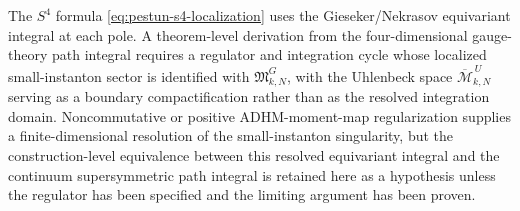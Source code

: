 \begin{hypothesis}
\label{hyp:field-theoretic-gieseker-matching}
The \(S^4\) formula
\eqref{eq:pestun-s4-localization} uses the Gieseker/Nekrasov equivariant
integral at each pole.  A theorem-level derivation from the four-dimensional
gauge-theory path integral requires a regulator and integration cycle whose
localized small-instanton sector is identified with
\(\mathfrak M_{k,N}^{G}\), with the Uhlenbeck space
\(\overline{\mathcal M}_{k,N}^{\,U}\) serving as a boundary compactification
rather than as the resolved integration domain.  Noncommutative or positive
ADHM-moment-map regularization supplies a finite-dimensional resolution of
the small-instanton singularity, but the construction-level equivalence
between this resolved equivariant integral and the continuum supersymmetric
path integral is retained here as a hypothesis unless the regulator has been
specified and the limiting argument has been proven.
\end{hypothesis}


